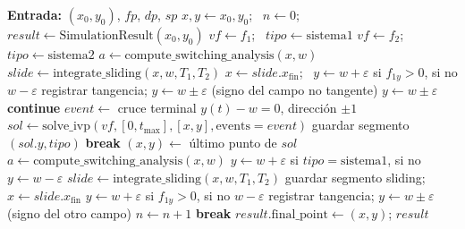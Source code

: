 \documentclass[12pt,letterpaper]{article}
\begin{document}
\begin{algorithm}[H]
\caption{Bucle event-driven de Filippov (adaptado de \cite{piiroinen2008event}, Algoritmo 1)}
\label{alg:event-driven}
\footnotesize
\begin{algorithmic}[1]
\State \textbf{Entrada:} $(x_0, y_0)$, $\mathit{fp}$, $\mathit{dp}$, $\mathit{sp}$
\State $x, y \gets x_0, y_0$; \ $n \gets 0$; \ $\mathit{result} \gets \text{SimulationResult}(x_0,y_0)$
    \State $\mathit{vf} \gets f_1$; \ $\mathit{tipo} \gets \text{sistema1}$
    \State $\mathit{vf} \gets f_2$; \ $\mathit{tipo} \gets \text{sistema2}$
  \Else
    \State $a \gets \text{compute\_switching\_analysis}(x, w)$ 
      \State $\mathit{slide} \gets \text{integrate\_sliding}(x, w, T_1, T_2)$
      \State $x \gets \mathit{slide}.x_{\mathrm{fin}}$; \ $y \gets w + \varepsilon$ si $f_{1y} > 0$, si no $w - \varepsilon$
      \State registrar tangencia; $y \gets w \pm \varepsilon$ (signo del campo no tangente)
    \Else
      \State $y \gets w \pm \varepsilon$ 
    \EndIf
    \State \textbf{continue}
  \EndIf
  \State $\mathit{event} \gets$ cruce terminal $y(t) - w = 0$, dirección $\pm 1$
  \State $\mathit{sol} \gets \text{solve\_ivp}(\mathit{vf}, [0, t_{\max}], [x, y], \text{events}=\mathit{event})$
  \State guardar segmento $(\mathit{sol}.y, \mathit{tipo})$
   \State \textbf{break} \EndIf
  \State $(x, y) \gets$ último punto de $\mathit{sol}$ 
  \State $a \gets \text{compute\_switching\_analysis}(x, w)$
    \State $y \gets w + \varepsilon$ si $\mathit{tipo} = \text{sistema1}$, si no $y \gets w - \varepsilon$
    \State $\mathit{slide} \gets \text{integrate\_sliding}(x, w, T_1, T_2)$
    \State guardar segmento sliding; $x \gets \mathit{slide}.x_{\mathrm{fin}}$
    \State $y \gets w + \varepsilon$ si $f_{1y} > 0$, si no $w - \varepsilon$
  \Else
    \State registrar tangencia; $y \gets w \pm \varepsilon$ (signo del otro campo)
  \EndIf
  \State $n \gets n + 1$
   \State \textbf{break} \EndIf
\EndWhile
\Statex
\State $\mathit{result}.\text{final\_point} \gets (x, y)$; \Return $\mathit{result}$
\end{algorithmic}
\end{algorithm}
\end{document}
